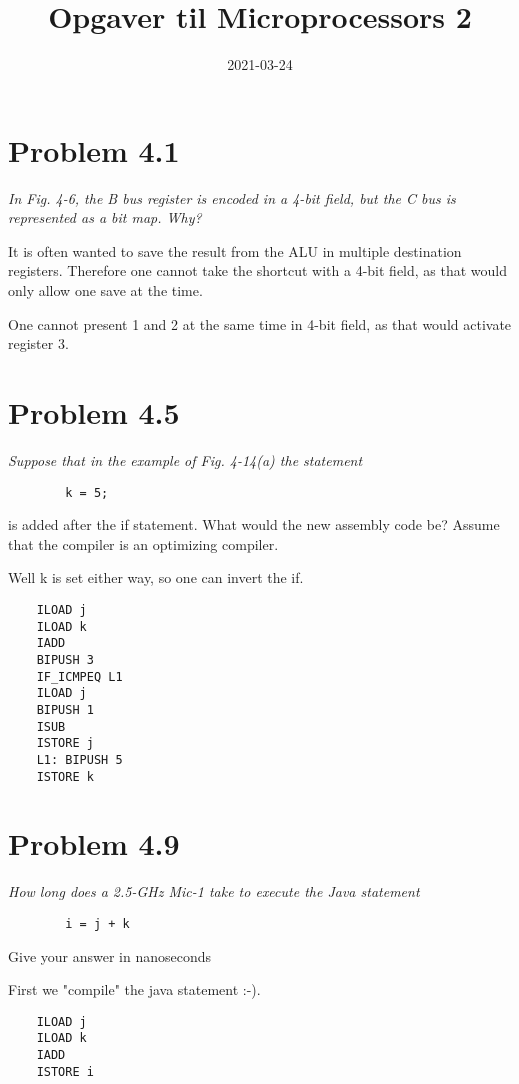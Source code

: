 \title{Opgaver til Microprocessors 2}
\date{2021-03-24}

\section{Problem 4.1}

\emph{In Fig. 4-6, the B bus register is encoded in a 4-bit field, but the C bus is represented
as a bit map. Why?}

It is often wanted to save the result from the ALU in multiple destination registers.
Therefore one cannot take the shortcut with a 4-bit field, as that would only allow one save at the time.

One cannot present 1 and 2 at the same time in 4-bit field, as that would activate register 3.

\section{Problem 4.5}

{\itshape
    Suppose that in the example of Fig. 4-14(a) the statement
    \begin{verbatim}
        k = 5;
    \end{verbatim}
    is added after the if statement. What would the new assembly code be? Assume that
    the compiler is an optimizing compiler.
}

Well k is set either way, so one can invert the if.

\begin{verbatim}
    ILOAD j
    ILOAD k
    IADD
    BIPUSH 3
    IF_ICMPEQ L1
    ILOAD j
    BIPUSH 1
    ISUB
    ISTORE j
    L1: BIPUSH 5
    ISTORE k
\end{verbatim}

\section{Problem 4.9}

{\itshape
    How long does a 2.5-GHz Mic-1 take to execute the Java statement
    \begin{verbatim}
        i = j + k
    \end{verbatim}
    Give your answer in nanoseconds
}

First we "compile" the java statement :-).

\begin{verbatim}
    ILOAD j
    ILOAD k
    IADD
    ISTORE i
\end{verbatim}

